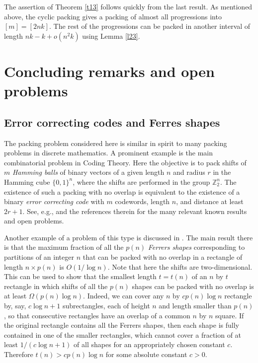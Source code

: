 \documentclass[12pt]{amsart}
\theoremstyle{plain}
\numberwithin{equation}{section}
\begin{document}
The assertion of Theorem \ref{t13} follows quickly from the last result. As mentioned above, the cyclic packing gives a packing of almost all progressions into $[m]=[2nk]$. The rest of the progressions can be packed in another interval of length $nk-k+o(n^2 k)$ using Lemma \ref{l23}.

\section{Concluding remarks and open problems}

\subsection{Error correcting codes and Ferres shapes}
The packing problem considered here is similar in spirit to many packing problems in discrete mathematics. A prominent example is the main combinatorial problem in Coding Theory. 
Here the objective is to pack shifts of $m$ \emph{Hamming balls} of binary vectors of a given 
length $n$ and radius $r$ in the Hamming cube $\{0,1\}^n$, where the shifts are performed in the group  $\mathbb{Z}_2^n$. The existence of such a packing with no overlap is equivalent to the existence of a binary \emph{error correcting code} with $m$ codewords, length $n$, and distance at least
$2r+1$.  See, e.g., \cite{MS} and the references therein for the many relevant known results and open problems.

Another example of a problem of this type is discussed in \cite{ABS}. The main result there
is that the maximum fraction of all the $p(n)$ \emph{Ferrers shapes} corresponding to partitions of an integer $n$ that can be packed with no overlap in a rectangle of length $n \times p(n)$ is $O(1/\log n)$. Note that here the shifts are two-dimensional. This can be used to show
that the smallest length $t=t(n)$  of an $n$ by $t$ rectangle in which shifts of all
the $p(n)$ shapes can be packed with no overlap is at least $\Omega(p(n) \log n)$. Indeed, we can cover any $n$ by $cp(n) \log n$ rectangle by, say, $c \log n +1$ subrectangles,
each of height $n$ and length smaller than $p(n)$, so that consecutive rectangles have an overlap of a common $n$ by $n$ square. If the original rectangle contains all the Ferrers shapes, then each shape is fully contained in one of the smaller rectangles, which cannot cover a fraction of at least $1/(c \log n+1)$ of all shapes for an appropriately chosen constant $c$.
Therefore $t(n) > c p(n) \log n$ for some absolute constant $c>0$. 
\end{document}
